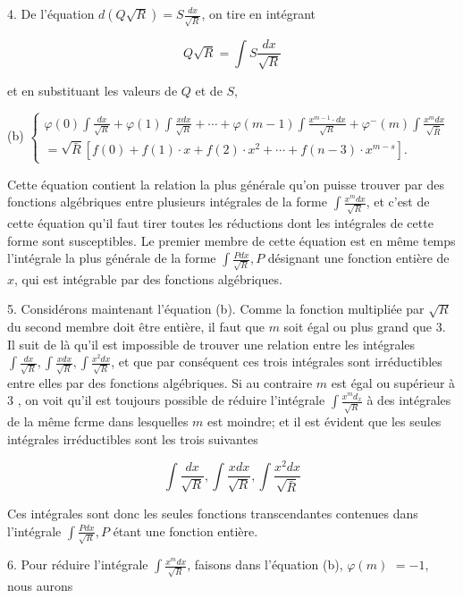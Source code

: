 \documentclass{article}
\begin{document}
4. De l'équation \(d(Q \sqrt{R})=S \frac{d x}{\sqrt{R}}\), on tire en intégrant

\[
Q \sqrt{R}=\int S \frac{d x}{\sqrt{R}}
\]

et en substituant les valeurs de \(Q\) et de \(S\),

(b) \(\left\{\begin{array}{c}\varphi(0) \int \frac{d x}{\sqrt{R}}+\varphi(1) \int \frac{x d x}{\sqrt{R}}+\cdots+\varphi(m-1) \int \frac{x^{m-1} \cdot d x}{\sqrt{R}}+\varphi^{-}(m) \int \frac{x^{m} d x}{\sqrt{\bar{R}}} \\ =\sqrt{\bar{R}}\left[f(0)+f(1) \cdot x+f(2) \cdot x^{2}+\cdots+f(n-3) \cdot x^{m-s}\right] .\end{array}\right.\)

Cette équation contient la relation la plus générale qu'on puisse trouver par des fonctions algébriques entre plusieurs intégrales de la forme \(\int \frac{x^{m} d x}{\sqrt{R}}\), et c'est de cette équation qu'il faut tirer toutes les réductions dont les intégrales de cette forme sont susceptibles. Le premier membre de cette équation est en même temps l'intégrale la plus générale de la forme \(\int \frac{P d x}{\sqrt{R}}, P\) désignant une fonction entière de \(x\), qui est intégrable par des fonctions algébriques.

5. Considérons maintenant l'équation (b). Comme la fonction multipliée par \(\sqrt{R}\) du second membre doit être entière, il faut que \(m\) soit égal ou plus grand que 3. Il suit de là qu'il est impossible de trouver une relation entre les intégrales \(\int \frac{d x}{\sqrt{R}}, \int \frac{x d x}{\sqrt{R}}, \int \frac{x^{2} d x}{\sqrt{R}}\), et que par conséquent ces trois intégrales sont irréductibles entre elles par des fonctions algébriques. Si au contraire \(m\) est égal ou supérieur à 3 , on voit qu'il est toujours possible de réduire l'intégrale \(\int \frac{x^{m} d_{x}}{\sqrt{R}}\) à des intégrales de la même fcrme dans lesquelles \(m\) est moindre; et il est évident que les seules intégrales irréductibles sont les trois suivantes

\[
\int \frac{d x}{\sqrt{R}}, \int \frac{x d x}{\sqrt{R}}, \int \frac{x^{2} d x}{\sqrt{\bar{R}}}
\]

Ces intégrales sont donc les seules fonctions transcendantes contenues dans l'intégrale \(\int \frac{P d x}{\sqrt{R}}, P\) étant une fonction entière.

6. Pour réduire l'intégrale \(\int \frac{x^{m} d x}{\sqrt{R}}\), faisons dans l'équation (b), \(\varphi(m)\) \(=-1\), nous aurons
\end{document}
